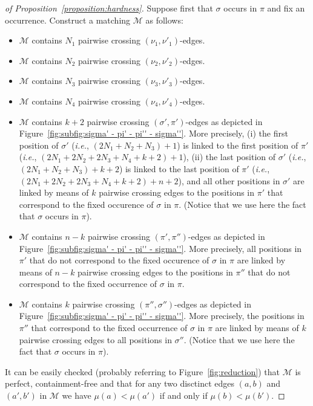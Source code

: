 \begin{proof}[of Proposition~\ref{proposition:hardness}]
  Suppose first that $\sigma$ occurs in $\pi$ and fix an occurrence.
  Construct a matching $\mathcal{M}$ as follows:
  \begin{itemize}
    \item $\mathcal{M}$ contains $N_1$ pairwise crossing
    $(\nu_1, \nu'_1)$-edges.
    \item $\mathcal{M}$ contains $N_2$ pairwise crossing
    $(\nu_2, \nu'_2)$-edges.
    \item $\mathcal{M}$ contains $N_3$ pairwise crossing
    $(\nu_3, \nu'_3)$-edges.
    \item $\mathcal{M}$ contains $N_4$ pairwise crossing
    $(\nu_4, \nu'_4)$-edges.
    \item $\mathcal{M}$ contains $k+2$ pairwise crossing
    $(\sigma', \pi')$-edges as depicted in
    Figure~\ref{fig:subfig:sigma' - pi' - pi'' - sigma''}.
    More precisely,
    (i) the first position of $\sigma'$
    (\emph{i.e.}, $(2N_1+N_2+N_3) + 1$) is linked
    to the first position of $\pi'$
    (\emph{i.e.}, $(2N_1 + 2N_2 + 2N_3 + N_4 + k + 2) + 1$),
    (ii) the last position of $\sigma'$
    (\emph{i.e.}, $(2N_1+N_2+N_3) + k+2$) is linked
    to the last position of $\pi'$
    (\emph{i.e.}, $(2N_1 + 2N_2 + 2N_3 + N_4 + k + 2) + n+2$),
    and all other positions in $\sigma'$ are linked by means of $k$ pairwise
    crossing edges to the positions in
    $\pi'$ that correspond to the fixed occurence of $\sigma$ in $\pi$.
    (Notice that we use here the fact that $\sigma$ occurs in $\pi$).
    \item $\mathcal{M}$ contains $n-k$ pairwise crossing
    $(\pi', \pi'')$-edges as depicted in
    Figure~\ref{fig:subfig:sigma' - pi' - pi'' - sigma''}.
    More precisely,
    all positions in $\pi'$ that do not correspond to the fixed occurence of
    $\sigma$ in $\pi$ are linked by means of $n-k$ pairwise crossing edges
    to the positions in $\pi''$ that do not correspond to the fixed
    occurrence of $\sigma$ in $\pi$.
    \item $\mathcal{M}$ contains $k$ pairwise crossing
    $(\pi'', \sigma'')$-edges as depicted in
    Figure~\ref{fig:subfig:sigma' - pi' - pi'' - sigma''}.
    More precisely, the positions in $\pi''$ that correspond to
    the fixed occurrence of $\sigma$ in $\pi$ are linked
    by means of $k$ pairwise crossing edges to all positions in
    $\sigma''$.
    (Notice that we use here the fact that $\sigma$ occurs in $\pi$).
  \end{itemize}
  It can be easily checked (probably referring to Figure~\ref{fig:reduction}) that
  $\mathcal{M}$ is perfect, containment-free and that
  for any two disctinct edges
  $(a, b)$ and $(a', b')$ in $\mathcal{M}$
  we have $\mu(a) < \mu(a')$ if and only if $\mu(b) < \mu(b')$.



\end{proof}
